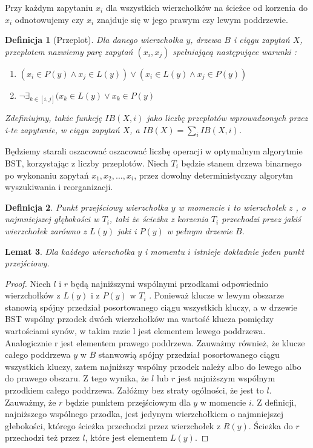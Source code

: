 \documentclass[declaration,shortabstract]{iithesis}
\newtheorem{definition}{Definicja}[chapter]
\theoremstyle{remark}
\theoremstyle{plain}
\theoremstyle{plain}
\theoremstyle{plain}
\newtheorem{lemma}[definition]{Lemat}
\begin{document}
Przy każdym zapytaniu \(x_i\) dla wszystkich wierzchołków na ścieżce od korzenia do \(x_i\) odnotowujemy czy \(x_i\) znajduje się w jego prawym czy lewym poddrzewie. 

\begin{definition}[Przeplot]
Dla danego wierzchołka \(y\), drzewa \(B\) i ciągu zapytań \(X\), przeplotem nazwiemy parę zapytań \((x_i, x_j)\) spełniającą następujące warunki : \\
\begin{enumerate}
\item{\( ( x_i \in P(y) \wedge x_j \in L(y)) \vee ( x_i \in L(y) \wedge x_j \in P(y))\)}
\item{\( \neg \exists_{k \in [i, j]}( x_k \in  L(y) \vee x_k \in P(y) \)}
\end{enumerate}

Zdefiniujmy, także funkcję \(IB(X, i)\) jako liczbę przeplotów wprowadzonych przez i-te zapytanie, w ciągu zapytań $X$, a \(IB(X) = \sum_i IB(X, i)\).
\end{definition}

Będziemy starali oszacować oszacować liczbę operacji w optymalnym algorytmie BST, korzystając z liczby przeplotów. Niech \(T_i\) będzie stanem drzewa binarnego po wykonaniu zapytań \( x_1, x_2, ..., x_i\), przez dowolny deterministyczny algorytm wyszukiwania i reorganizacji. 

\begin{definition}
Punkt przejściowy wierzchołka $y$ w momencie $i$ to wierzchołek $z$ , o najmniejszej  głębokości w \( T_i\), taki że ścieżka z korzenia $T_i$ przechodzi przez jakiś wierzchołek zarówno z $L(y)$ jaki i $P(y)$ w pełnym drzewie $B$.
\end{definition}

\begin{lemma}
Dla każdego wierzchołka $y$ i momentu $i$ istnieje dokładnie jeden punkt przejściowy.
\end{lemma}
\begin{proof}
Niech $l$ i $r$ będą najniższymi wspólnymi przodkami odpowiednio wierzchołków z $L(y)$ i  z $P(y)$ w $T_i$ . Ponieważ klucze w lewym obszarze stanowią spójny przedział posortowanego ciągu wszystkich kluczy, a w drzewie BST wspólny przodek dwóch wierzchołków ma wartość klucza pomiędzy wartościami synów, w takim razie l jest elementem lewego poddrzewa. Analogicznie r jest elementem prawego poddrzewa. Zauważmy również, że klucze całego poddrzewa $y$ w $B$ stanwowią spójny przedział posortowanego ciągu wszystkich kluczy, zatem najniższy wspólny przodek należy albo do lewego albo do prawego obszaru. Z tego wynika, że $l$ lub $r$ jest najniższym wspólnym przodkiem całego poddrzewa. Załóżmy bez straty ogólności, że jest to $l$. Zauważmy, że $r$ będzie punktem przejściowym dla $y$ w momencie $i$. Z definicji, najniższego wspólnego przodka, jest jedynym wierzchołkiem o najmniejszej głebokości, którego ścieżka przechodzi przez wierzchołek z $R(y)$. Ścieżka do $r$ przechodzi też przez $l$, które jest elementem $L(y)$. 
\end{proof}
\end{document}
